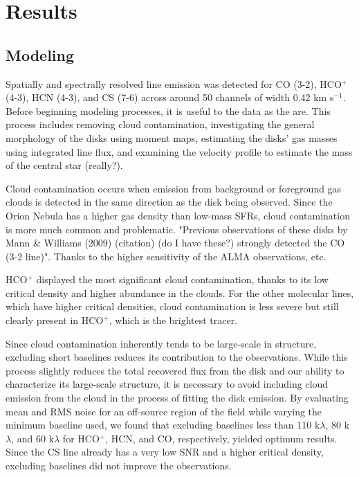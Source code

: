 \chapter{Results}
\label{chap:results}

\section{Modeling}


Spatially and spectrally resolved line emission was detected for CO (3-2), HCO$^{+}$ (4-3), HCN (4-3), and CS (7-6) across around 50 channels of width 0.42 km s$^{-1}$. Before beginning modeling processes, it is useful to the data as the are. This process includes removing cloud contamination, investigating the general morphology of the disks using moment maps, estimating the disks' gas masses using integrated line flux, and examining the velocity profile to estimate the mass of the central star (really?).

Cloud contamination occurs when emission from background or foreground gas clouds is detected in the same direction as the disk being observed. Since the Orion Nebula has a higher gas density than low-mass SFRs, cloud contamination is more much common and problematic. "Previous observations of these disks by Mann & Williams (2009) (citation) (do I have these?) strongly detected the CO (3-2 line)". Thanks to the higher sensitivity of the ALMA observations, etc.

HCO$^+$ displayed the most significant cloud contamination, thanks to its low critical density and higher abundance in the clouds. For the other molecular lines, which have higher critical densities, cloud contamination is less severe but still clearly present in HCO$^{+}$, which is the brightest tracer.

Since cloud contamination inherently tends to be large-scale in structure, excluding short baselines reduces its contribution to the observations. While this process slightly reduces the total recovered flux from the disk and our ability to characterize its large-scale structure, it is necessary to avoid including cloud emission from the cloud in the process of fitting the disk emission. By evaluating mean and RMS noise for an off-source region of the field while varying the minimum baseline used, we found that excluding baselines less than 110 k$\lambda$, 80 k$\lambda$, and 60  k$\lambda$ for HCO$^{+}$, HCN, and CO, respectively, yielded optimum results. Since the CS line already has a very low SNR and a higher critical density, excluding baselines did not improve the observations.



